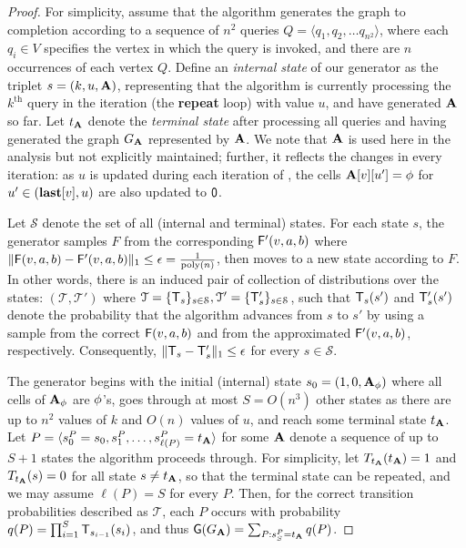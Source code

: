 \begin{proof}
\label{proof:transition}
For simplicity, assume that the algorithm generates the graph to completion according to a sequence of $n^2$  queries $Q = \langle q_1, q_2, \ldots q_{n^2}\rangle$, where each $q_i \in V$ specifies the vertex in which the query  is invoked, and there are $n$ occurrences of each vertex $Q$. Define an \emph{internal state} of our generator as the triplet $s = (k, u, \mathbf{A})$, representing that the algorithm is currently processing the $k^\textrm{th}$  query in the iteration (the \textbf{repeat} loop) with value $u$, and have generated $\mathbf{A}$ so far. Let $t_{\mathbf{A}}$ denote the \emph{terminal state} after processing all queries and having generated the graph $G_{\mathbf{A}}$ represented by $\mathbf{A}$. We note that $\mathbf{A}$ is used here in the analysis but not explicitly maintained; further, it reflects the changes in every iteration: as $u$ is updated during each iteration of , the cells $\mathbf{A}[v][u'] = \phi$ for $u' \in (\mathbf{last}[v],u)$ are also updated to $\mathsf{0}$.

Let $\mathcal{S}$ denote the set of all (internal and terminal) states. For each state $s$, the generator samples $F$ from the corresponding $\mathsf{F}'(v,a,b)$ where $\|\mathsf{F}(v,a,b)-\mathsf{F}'(v,a,b)\|_1 \leq \epsilon = \frac{1}{\mathrm{poly}(n)}$, then moves to a new state according to $F$. In other words, there is an induced pair of collection of distributions over the states: $(\mathcal{T},\mathcal{T}')$ where $\mathcal{T}=\{\mathsf{T}_s\}_{s\in\mathcal{S}}, \mathcal{T}'=\{\mathsf{T}'_s\}_{s\in\mathcal{S}}$, such that $\mathsf{T}_s(s')$ and $\mathsf{T}'_s(s')$ denote the probability that the algorithm advances from $s$ to $s'$ by using a sample from the correct $\mathsf{F}(v,a,b)$ and from the approximated $\mathsf{F}'(v,a,b)$, respectively. Consequently, $\|\mathsf{T}_s-\mathsf{T}'_s\|_1 \leq \epsilon$ for every $s\in\mathcal{S}$.

The generator begins with the initial (internal) state $s_0 = (1, 0, \mathbf{A}_\phi)$ where all cells of $\mathbf{A}_\phi$ are $\phi$'s, goes through at most $S=O(n^3)$ other states as there are up to $n^2$ values of $k$ and $O(n)$ values of $u$, and reach some terminal state $t_{\mathbf{A}}$. Let $P = \langle s^P_0 = s_0, s^P_1, \ldots, s^P_{\ell(P)} = t_{\mathbf{A}} \rangle$ for some $\mathbf{A}$ denote a sequence of up to $S+1$ states the algorithm proceeds through. For simplicity, let $T_{t_{\mathbf{A}}}(t_{\mathbf{A}})=1$ and $T_{t_{\mathbf{A}}}(s)=0$ for all state $s \neq t_{\mathbf{A}}$, so that the terminal state can be repeated, and we may assume $\ell(P) = S$ for every $P$. Then, for the correct transition probabilities described as $\mathcal{T}$, each $P$ occurs with probability $q(P) = \prod_{i=1}^{S} \mathsf{T}_{s_{i-1}}(s_i)$, and thus $\mathsf{G}(G_{\mathbf{A}}) = \sum_{P:s^P_{S} = t_{\mathbf{A}}} q(P)$.


\end{proof}
